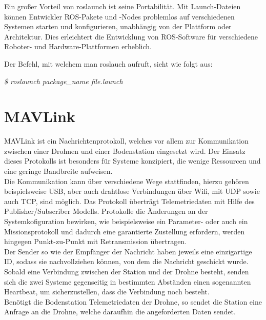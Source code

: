    Ein großer Vorteil von roslaunch ist seine Portabilität. Mit Launch-Dateien können Entwickler ROS-Pakete und -Nodes problemlos auf verschiedenen Systemen starten und konfigurieren, unabhängig von der Plattform oder Architektur. Dies erleichtert die Entwicklung von ROS-Software für verschiedene Roboter- und Hardware-Plattformen erheblich. \cite{roslaunch}

    Der Befehl, mit welchem man roslauch aufruft, sieht wie folgt aus:
    
    \textit{\$ roslaunch package\_name file.launch}

\section{MAVLink} \label{mavlink}
\ac{MAVLink} ist ein Nachrichtenprotokoll, welches vor allem zur Kommunikation zwischen einer Drohnen und einer Bodenstation eingesetzt wird. Der Einsatz dieses Protokolls ist besonders für Systeme konzipiert, die wenige Ressourcen und eine geringe Bandbreite aufweisen.\\
Die Kommunikation kann über verschiedene Wege stattfinden, hierzu gehören beispielsweise \ac{USB}, aber auch drahtlose Verbindungen über Wifi, mit \ac{UDP} sowie auch \ac{TCP}, sind möglich. Das Protokoll überträgt Telemetriedaten mit Hilfe des Publisher/Subscriber Modells. Protokolle die Änderungen an der Systemkofiguration bewirken, wie beispielsweise ein Parameter- oder auch ein Missionsprotokoll und dadurch eine garantierte Zustellung erfordern, werden hingegen Punkt-zu-Punkt mit Retransmission übertragen. 
\\
Der Sender so wie der Empfänger der Nachricht haben jeweils eine einzigartige ID, sodass sie nachvollziehen können, von dem die Nachricht geschickt wurde. Sobald eine Verbindung zwischen der Station und der Drohne besteht, senden sich die zwei Systeme gegenseitig in bestimmten Abständen einen sogenannten Heartbeat, um sicherzustellen, dass die Verbindung noch besteht.
\\
Benötigt die Bodenstation Telemetriedaten der Drohne, so sendet die Station eine Anfrage an die Drohne, welche daraufhin die angeforderten Daten sendet. \cite{mavlink}

